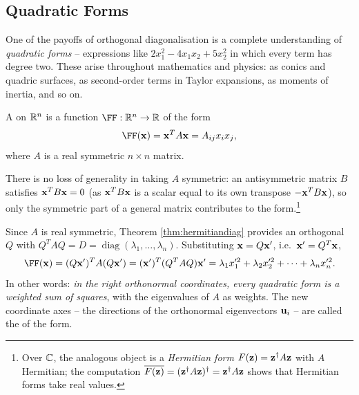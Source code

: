 \documentclass[a4paper]{scrartcl}
\newcommand{\diag}{\operatorname{diag}}
\begin{document}
\subsection{Quadratic Forms}

One of the payoffs of orthogonal diagonalisation is a complete understanding of \emph{quadratic forms} -- expressions like $2x_1^2 - 4x_1x_2 + 5x_2^2$ in which every term has degree two. These arise throughout mathematics and physics: as conics and quadric surfaces, as second-order terms in Taylor expansions, as moments of inertia, and so on.

\begin{definition}
	A  on $\mathbb{R}^n$ is a function $\FF: \R^n \rightarrow \R$ of the form
	$$
	\FF(\vv{x}) = \vv{x}^T A \vv{x} = A_{ij}x_ix_j,
	$$
	where $A$ is a real symmetric $n \times n$ matrix.
\end{definition}

There is no loss of generality in taking $A$ symmetric: an antisymmetric matrix $B$ satisfies $\mathbf{x}^TB\mathbf{x} = 0$ (as $\mathbf{x}^TB\mathbf{x}$ is a scalar equal to its own transpose $-\mathbf{x}^TB\mathbf{x}$), so only the symmetric part of a general matrix contributes to the form.\footnote{Over $\mathbb{C}$, the analogous object is a \emph{Hermitian form} $F(\mathbf{z}) = \mathbf{z}^\dagger A \mathbf{z}$ with $A$ Hermitian; the computation $\overline{F(\mathbf{z})} = (\mathbf{z}^\dagger A \mathbf{z})^\dagger = \mathbf{z}^\dagger A \mathbf{z}$ shows that Hermitian forms take real values.}

Since $A$ is real symmetric, Theorem \ref{thm:hermitiandiag} provides an orthogonal $Q$ with $Q^TAQ = D = \diag(\lambda_1, \dots, \lambda_n)$. Substituting $\mathbf{x} = Q\mathbf{x}'$, i.e.\ $\mathbf{x}' = Q^T \mathbf{x}$,
$$
\FF(\vv{x}) = (Q\vv{x}')^T A (Q \vv{x}') = (\vv{x}')^T (Q^TAQ) \vv{x}' = \lambda_1 x_1'^2 + \lambda_2 x_2'^2 + \cdots + \lambda_n x_n'^2.
$$
In other words: \emph{in the right orthonormal coordinates, every quadratic form is a weighted sum of squares}, with the eigenvalues of $A$ as weights. The new coordinate axes -- the directions of the orthonormal eigenvectors $\mathbf{u}_i$ -- are called the  of the form.
\end{document}

